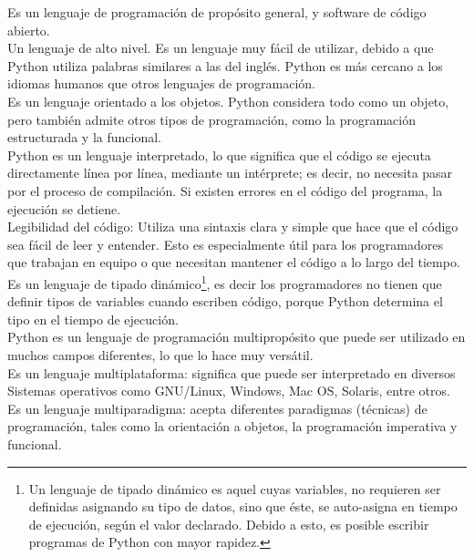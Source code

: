  
 Es un lenguaje de programación de propósito general, y software de código abierto.\\
 
 Un lenguaje de alto nivel. Es un lenguaje muy fácil de utilizar, debido a que Python utiliza palabras similares a las del inglés. Python es más cercano a los idiomas humanos que otros lenguajes de programación. \\
 
  Es un lenguaje orientado a los objetos. Python considera todo como un objeto, pero también admite otros 
    tipos de programación, como la programación estructurada y la funcional.\\
 
  Python es un lenguaje interpretado, lo que significa que el código se ejecuta directamente línea por línea,  mediante un intérprete; es decir, no necesita pasar por el proceso de compilación. Si existen errores en el  código del programa, la ejecución se detiene.\\
  
   Legibilidad del código: Utiliza una sintaxis clara y simple que hace que el código sea fácil de leer y entender. Esto es especialmente útil para los programadores que trabajan en equipo o que necesitan mantener el código a lo largo del tiempo.\\
  
   Es un lenguaje de tipado dinámico\footnote{\scriptsize{Un lenguaje de tipado dinámico es aquel cuyas variables, no requieren ser definidas asignando su tipo de datos, sino que éste, se auto-asigna en tiempo de ejecución, según el valor declarado.  Debido a esto, es posible escribir programas de Python con mayor rapidez.}}, es decir los programadores no tienen que definir tipos de variables cuando escriben código, porque Python determina el tipo en el tiempo de ejecución. \\
  
   Python es un lenguaje de programación multipropósito que puede ser utilizado en muchos campos diferentes, lo que lo hace muy versátil.\\
   
   Es un lenguaje multiplataforma: significa que puede ser interpretado en diversos Sistemas
   operativos como GNU/Linux, Windows, Mac OS, Solaris, entre otros.\\
   
   Es un lenguaje multiparadigma: acepta diferentes paradigmas (técnicas) de programación, tales
   como la orientación a objetos, la programación imperativa y funcional.\\
   
